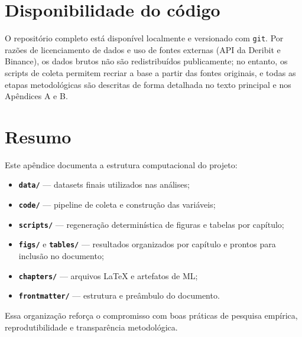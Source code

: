 \section{Disponibilidade do código}

O repositório completo está disponível localmente e versionado com
\texttt{git}. Por razões de licenciamento de dados e uso de fontes externas
(API da Deribit e Binance), os dados brutos não são redistribuídos
publicamente; no entanto, os scripts de coleta permitem recriar a base a partir
das fontes originais, e todas as etapas metodológicas são descritas de forma
detalhada no texto principal e nos Apêndices A e B.

\section{Resumo}

Este apêndice documenta a estrutura computacional do projeto:
\begin{itemize}
    \item \textbf{\texttt{data/}} — datasets finais utilizados nas análises;
    \item \textbf{\texttt{code/}} — pipeline de coleta e construção das variáveis;
    \item \textbf{\texttt{scripts/}} — regeneração determinística de figuras e
          tabelas por capítulo;
    \item \textbf{\texttt{figs/}} e \textbf{\texttt{tables/}} — resultados
          organizados por capítulo e prontos para inclusão no documento;
    \item \textbf{\texttt{chapters/}} — arquivos \LaTeX{} e artefatos de ML;
    \item \textbf{\texttt{frontmatter/}} — estrutura e preâmbulo do documento.
\end{itemize}

Essa organização reforça o compromisso com boas práticas de pesquisa empírica,
reprodutibilidade e transparência metodológica.

